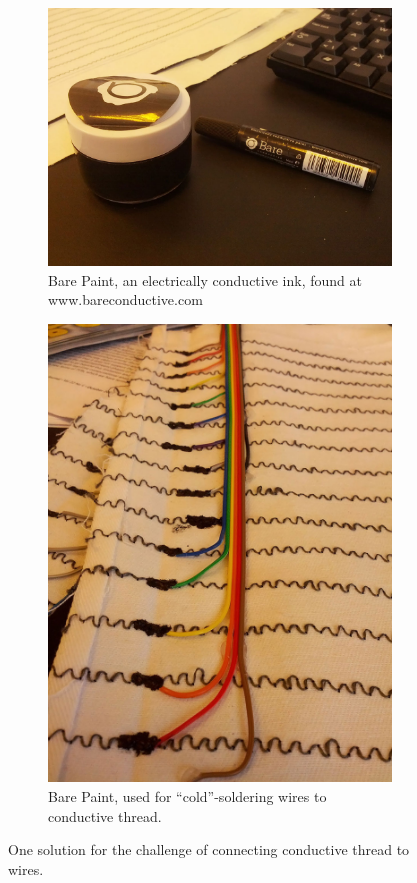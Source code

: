 \begin{figure}[t]
\centering
\begin{subfigure}[t]{.45\textwidth}
  \centering
  \includegraphics[width=.9\linewidth]{figures/touch/barepaint}
  \caption{Bare Paint, an electrically conductive ink, found at www.bareconductive.com}
\end{subfigure}%
\hspace{0.5cm}
\begin{subfigure}[t]{.45\textwidth}
  \centering
  \includegraphics[width=.9\linewidth]{figures/touch/connectors}
  \caption{Bare Paint, used for ``cold''-soldering wires to conductive thread.}
\end{subfigure}
\caption{One solution for the challenge of connecting conductive thread to wires.}
\label{fig:ch:textiletouch:barepaint}
\end{figure}

